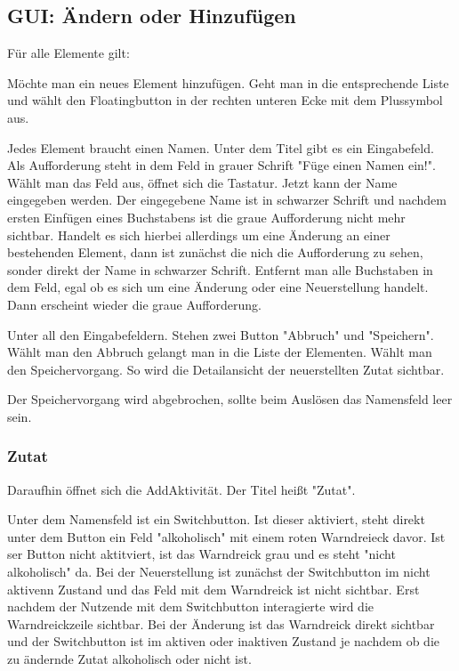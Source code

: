 \subsection{GUI: Ändern oder Hinzufügen}

Für alle Elemente gilt:

Möchte man ein neues Element hinzufügen. Geht man in die entsprechende Liste und wählt den Floatingbutton in der rechten unteren Ecke mit dem Plussymbol aus.

Jedes Element braucht einen Namen. Unter dem Titel gibt es ein Eingabefeld. Als Aufforderung steht in dem Feld in grauer Schrift "Füge einen Namen ein!". Wählt man das Feld aus, öffnet sich die Tastatur. Jetzt kann der Name eingegeben werden. Der eingegebene Name ist in schwarzer Schrift und nachdem ersten Einfügen eines Buchstabens ist die graue Aufforderung nicht mehr sichtbar. Handelt es sich hierbei allerdings um eine Änderung an einer bestehenden Element, dann ist zunächst die nich die Aufforderung zu sehen, sonder direkt der Name in schwarzer Schrift. Entfernt man alle Buchstaben in dem Feld, egal ob es sich um eine Änderung oder eine Neuerstellung handelt. Dann erscheint wieder die graue Aufforderung.

Unter all den Eingabefeldern. Stehen zwei Button "Abbruch" und "Speichern". Wählt man den Abbruch gelangt man in die Liste der Elementen. Wählt man den Speichervorgang. So wird die Detailansicht der neuerstellten Zutat sichtbar.

Der Speichervorgang wird abgebrochen, sollte beim Auslösen das Namensfeld leer sein.

\subsubsection{ Zutat}

Daraufhin öffnet sich die AddAktivität. Der Titel heißt "Zutat".

Unter dem Namensfeld ist ein Switchbutton. Ist dieser aktiviert, steht direkt unter dem Button ein Feld "alkoholisch" mit einem roten Warndreieck davor. Ist ser Button nicht aktitviert, ist das Warndreick grau und es steht "nicht alkoholisch" da. Bei der Neuerstellung ist zunächst der Switchbutton im nicht aktivenn Zustand und das Feld mit dem Warndreick ist nicht sichtbar. Erst nachdem der Nutzende mit dem Switchbutton interagierte wird die Warndreickzeile sichtbar. Bei der Änderung ist das Warndreick direkt sichtbar und der Switchbutton ist im aktiven oder inaktiven Zustand je nachdem ob die zu ändernde Zutat alkoholisch oder nicht ist.

